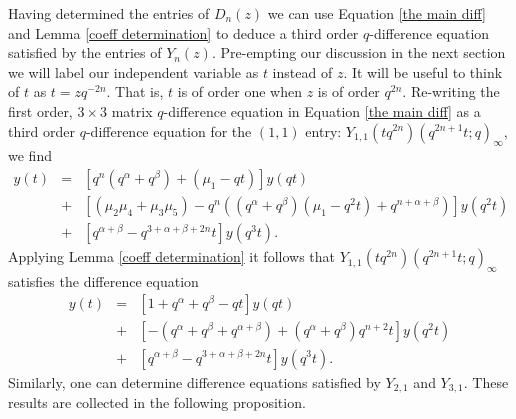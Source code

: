 \documentclass[a4paper,reqno]{amsart}
\numberwithin{equation}{section}
\numberwithin{figure}{section}
\begin{document}
Having determined the entries of $D_n(z)$ we can use Equation \eqref{the main diff} and Lemma \ref{coeff determination} to deduce a third order $q$-difference equation satisfied by the entries of $Y_n(z)$. Pre-empting our discussion in the next section we will label our independent variable as $t$ instead of $z$. It will be useful to think of $t$ as $t=zq^{-2n}$. That is, $t$ is of order one when $z$ is of order $q^{2n}$. Re-writing the first order, $3\times3$ matrix $q$-difference equation in Equation \eqref{the main diff} as a third order $q$-difference equation for the $(1,1)$ entry: $Y_{1,1}(tq^{2n})(q^{2n+1}t;q)_\infty$, we find
\begin{eqnarray}
y(t) &=& \left[q^n(q^\alpha+q^\beta) + (\mu_1-qt)\right]y(qt) \nonumber \\
&+& \left[(\mu_2\mu_4+\mu_3\mu_5) - q^n\left((q^\alpha+q^\beta)(\mu_1-q^{2}t) +q^{n+\alpha+\beta}\right)\right]y(q^2t) \nonumber \\
&+& \left[ q^{\alpha+\beta}-q^{3+\alpha+\beta+2n}t\right]y(q^3t). \label{1st diff v2}
\end{eqnarray}
Applying Lemma \ref{coeff determination} it follows that $Y_{1,1}(tq^{2n})(q^{2n+1}t;q)_\infty$ satisfies the difference equation
\begin{eqnarray}
y(t) &=& \left[ 1+q^\alpha + q^\beta-qt\right]y(qt) \nonumber \\
&+& \left[-(q^\alpha + q^\beta + q^{\alpha+\beta}) + (q^\alpha+q^\beta)q^{n+2}t\right]y(q^2t) \nonumber \\
&+& \left[ q^{\alpha+\beta}-q^{3+\alpha+\beta+2n}t\right]y(q^3t). \nonumber
\end{eqnarray}
Similarly, one can determine difference equations satisfied by $Y_{2,1}$ and $Y_{3,1}$. These results are collected in the following proposition.
\end{document}
